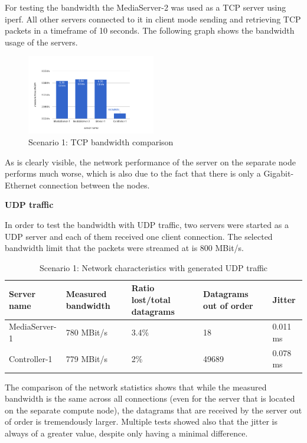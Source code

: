 For testing the bandwidth the MediaServer-2 was used as a TCP server using iperf. All other servers connected to it in client mode sending and retrieving TCP packets in a timeframe of 10 seconds. The following graph shows the bandwidth usage of the servers.

\begin{figure}[H]
\centering

\includegraphics[width=0.5\textwidth]{images/evaluation/testbed_scenario1_bw}

\caption{Scenario 1: TCP bandwidth comparison}
\end{figure}

As is clearly visible, the network performance of the server on the separate node performs much worse, which is also due to the fact that there is only a Gigabit-Ethernet connection between the nodes.

\textbf{UDP traffic}

In order to test the bandwidth with UDP traffic, two servers were started as a UDP server and each of them received one client connection. The selected bandwidth limit that the packets were streamed at is 800 MBit/s.

\begin{table}[H]
\centering

\begin{tabularx}{\textwidth}{ |X|X|X|X|X| }
\hline Server name & Measured bandwidth & Ratio lost/total datagrams & Datagrams out of order & Jitter \\ 
\hline MediaServer-1 & 780 MBit/s & 3.4\% & 18 & 0.011 ms\\ 
\hline Controller-1 & 779 MBit/s & 2\% & 49689 & 0.078 ms \\ 
\hline 
\end{tabularx}

\caption{Scenario 1: Network characteristics with generated UDP traffic}
\end{table}

The comparison of the network statistics shows that while the measured bandwidth is the same across all connections (even for the server that is located on the separate compute node), the datagrams that are received by the server out of order is tremendously larger. Multiple tests showed also that the jitter is always of a greater value, despite only having a minimal difference.


